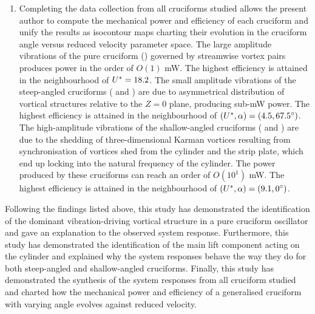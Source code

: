 \documentclass[oneside]{utmthesis}
\begin{document}
\begin{enumerate}
  \item Completing the data collection from all cruciforms studied allows the present author to compute the mechanical power and efficiency of each cruciform and unify the results as isocontour maps charting their evolution in the cruciform angle versus reduced velocity parameter space. The large amplitude vibrations of the pure cruciform (\angfi{}) governed by streamwise vortex pairs produces power in the order of $O(1)$ \si{\milli\watt}. The highest efficiency is attained in the neighbourhood of $U^{*} = 18.2$. The small amplitude vibrations of the steep-angled cruciforms (\angfo{} and \angth{}) are due to asymmetrical distribution of vortical structures relative to the $Z = 0$ plane, producing sub-\si{\milli\watt} power. The highest efficiency is attained in the neighbourhood of $(\ured,\alpha) = (\urtw,\angfo)$. The high-amplitude vibrations of the shallow-angled cruciforms (\angtw{} and \angon{}) are due to the shedding of three-dimensional Karman vortices resulting from synchronisation of vortices shed from the cylinder and the strip plate, which end up locking into the natural frequency of the cylinder. The power produced by these cruciforms can reach an order of $O(10^{1})$ \si{\milli\watt}. The highest efficiency is attained in the neighbourhood of $(\ured,\alpha) = (\urfo,\angon)$.
\end{enumerate}

Following the findings listed above, this study has demonstrated the  identification of the dominant vibration-driving vortical structure in a pure cruciform oscillator and gave an explanation to the observed system response. Furthermore, this study has demonstrated the identification of the main lift component acting on the cylinder and explained why the system responses behave the way they do for both steep-angled and shallow-angled cruciforms. Finally, this study has demonstrated the synthesis of the system responses from all cruciform studied and charted how the mechanical power and efficiency of a generalised cruciform with varying angle evolves against reduced velocity.

\end{document}
